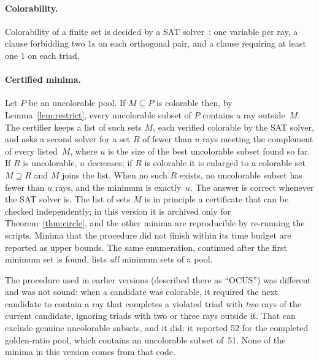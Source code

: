 \paragraph{Colorability.}  Colorability of a finite set is decided by a SAT
solver~\cite{AudemardSimon2018}: one variable per ray, a clause forbidding two 1s on each
orthogonal pair, and a clause requiring at least one 1 on each triad.

\paragraph{Certified minima.}  Let $P$ be an uncolorable pool.  If $M\subseteq P$ is colorable
then, by Lemma~\ref{lem:restrict}, every uncolorable subset of $P$ contains a ray outside~$M$.
The certifier keeps a list of such sets $M$, each verified colorable by the SAT solver, and asks
a second solver for a set $R$ of fewer than $u$ rays meeting the complement of every listed~$M$,
where $u$ is the size of the best uncolorable subset found so far.  If $R$ is uncolorable, $u$
decreases; if $R$ is colorable it is enlarged to a colorable set $M\supseteq R$ and $M$ joins the
list.  When no such $R$ exists, no uncolorable subset has fewer than $u$ rays, and the minimum is
exactly~$u$.  The answer is correct whenever the SAT solver is.  The list of sets $M$ is in principle a
certificate that can be checked independently; in this version it is archived only for
Theorem~\ref{thm:circle}, and the other minima are reproducible by re-running the scripts.  Minima that the procedure did not finish within
its time budget are reported as upper bounds.  The same enumeration, continued after the first
minimum set is found, lists \emph{all} minimum sets of a pool.

The procedure used in earlier versions (described there as ``OCUS'') was different and was not
sound: when a candidate was colorable, it required the next candidate to contain a ray that
completes a violated triad with \emph{two} rays of the current candidate, ignoring triads with
two or three rays outside it.  That can exclude genuine uncolorable subsets, and it did: it
reported 52 for the completed golden-ratio pool, which contains an uncolorable subset of~51.
None of the minima in this version comes from that code.
